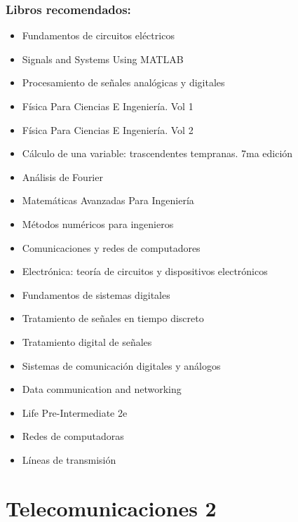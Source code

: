 \documentclass[
	12pt, %
	fleqn, %
	a4paper, %
	oneside, %
]{LegrandOrangeBook}
\begin{document}
\section*{Libros recomendados:}
\begin{itemize}
\item Fundamentos de circuitos eléctricos\cite{alexander2013fundamentos}
\item Signals and Systems Using MATLAB\cite{chaparro2018signals}
\item Procesamiento de señales analógicas y digitales\cite{ambardar1995analog}
\item Física Para Ciencias E Ingeniería. Vol 1\cite{serway2018fisica1}
\item Física Para Ciencias E Ingeniería. Vol 2\cite{serway2018fisica2}
\item Cálculo de una variable: trascendentes tempranas. 7ma edición \cite{stewart12calculo}
\item Análisis de Fourier\cite{hsu1998analisis}
\item Matemáticas Avanzadas Para Ingeniería\cite{o2014matematicas}
\item Métodos numéricos para ingenieros\cite{chapra2013metodos}
\item Comunicaciones y redes de computadores\cite{stallings2004comunicaciones}
\item Electrónica: teoría de circuitos y dispositivos electrónicos\cite{boylestad1989electronica}
\item Fundamentos de sistemas digitales\cite{floyd2006fundamentos}
\item Tratamiento de señales en tiempo discreto\cite{oppenheim2011tratamiento}
\item Tratamiento digital de señales\cite{proakis2007tratamiento}
\item Sistemas de comunicación digitales y análogos\cite{couchsistemas}
\item Data communication and networking\cite{forouzan2007data}
\item Life Pre-Intermediate 2e\cite{hughes2017life}
\item Redes de computadoras\cite{tanenbaum2012computer}
\item Líneas de transmisión\cite{velalineas1999}
\end{itemize}
\part{Telecomunicaciones 2}
\end{document}
